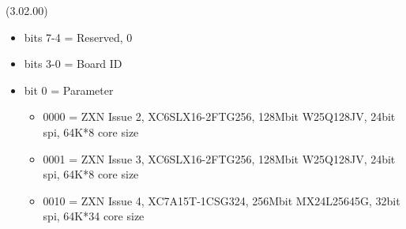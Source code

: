  (3.02.00)
\begin{itemize}
\item bits 7-4 = Reserved, 0
\item bits 3-0 = Board ID
\item bit 0 = Parameter
  \begin{itemize}
  \item[] 0000 = ZXN Issue 2, XC6SLX16-2FTG256, 128Mbit W25Q128JV, 24bit spi, 64K*8 core size
  \item[] 0001 = ZXN Issue 3, XC6SLX16-2FTG256, 128Mbit W25Q128JV, 24bit spi, 64K*8 core size
  \item[] 0010 = ZXN Issue 4, XC7A15T-1CSG324, 256Mbit MX24L25645G, 32bit spi, 64K*34 core size
  \end{itemize}
\end{itemize}

